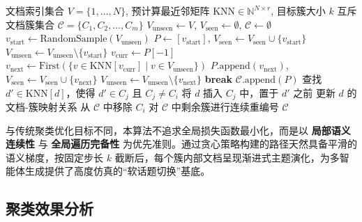 \begin{algorithm}[!ht]
\caption{贪心遍历聚类与簇合并算法}
\label{alg:greedy_traversal}
\begin{algorithmic}[1]
\Require 文档索引集合 $V = \{1, \dots, N\}$, 预计算最近邻矩阵 $\text{KNN} \in \mathbb{N}^{N \times r}$, 目标簇大小 $k$
\Ensure 互斥文档簇集合 $\mathcal{C} = \{C_1, C_2, \dots, C_m\}$
\State $V_{\text{unseen}} \gets V$, $V_{\text{seen}} \gets \emptyset$, $\mathcal{C} \gets \emptyset$
 
    \State $v_{\text{start}} \gets \text{RandomSample}(V_{\text{unseen}})$
    \State $P \gets [v_{\text{start}}]$, $V_{\text{seen}} \gets V_{\text{seen}} \cup \{v_{\text{start}}\}$
    \State $V_{\text{unseen}} \gets V_{\text{unseen}} \setminus \{v_{\text{start}}\}$
        \State $v_{\text{curr}} \gets P[-1]$
        \State $v_{\text{next}} \gets \text{First}(\{v \in \text{KNN}[v_{\text{curr}}] \mid v \in V_{\text{unseen}}\})$
            \State $P.\text{append}(v_{\text{next}})$, $V_{\text{seen}} \gets V_{\text{seen}} \cup \{v_{\text{next}}\}$
            \State $V_{\text{unseen}} \gets V_{\text{unseen}} \setminus \{v_{\text{next}}\}$
        \Else
            \State \textbf{break} 
        \EndIf
    \EndWhile
    \State $\mathcal{C}.\text{append}(P)$
\EndWhile
\State {}
        \State 查找 $d' \in \text{KNN}[d]$，使得 $d' \in C_j$ 且 $C_j \neq C_i$
            \State 将 $d$ 插入 $C_j$ 中，置于 $d'$ 之前
            \State 更新 $d$ 的文档-簇映射关系
        \EndIf
    \EndFor
    \State 从 $\mathcal{C}$ 中移除 $C_i$
\EndFor
\State 对 $\mathcal{C}$ 中剩余簇进行连续重编号
\State \Return $\mathcal{C}$
\end{algorithmic}
\end{algorithm}



与传统聚类优化目标不同，本算法不追求全局损失函数最小化，而是以 \textbf{局部语义连续性} 与 \textbf{全局遍历完备性} 为优先准则。通过贪心策略构建的路径天然具备平滑的语义梯度，按固定步长 $k$ 截断后，每个簇内部文档呈现渐进式主题演化，为多智能体生成提供了高度仿真的“软话题切换”基底。



\subsection{聚类效果分析}



